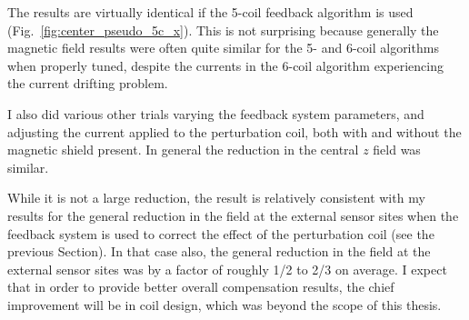 
The results are virtually identical if the 5-coil feedback algorithm
is used (Fig.~\ref{fig:center_pseudo_5c_x}).  This is not surprising
because generally the magnetic field results were often quite similar
for the 5- and 6-coil algorithms when properly tuned, despite the
currents in the 6-coil algorithm experiencing the current drifting
problem.




I also did various other trials varying the feedback system
parameters, and adjusting the current applied to the perturbation
coil, both with and without the magnetic shield present.  In general
the reduction in the central $z$ field was similar.

While it is not a large reduction, the result is relatively consistent
with my results for the general reduction in the field at the external
sensor sites when the feedback system is used to correct the effect of
the perturbation coil (see the previous Section).  In that case also,
the general reduction in the field at the external sensor sites was by a factor of roughly 1/2 to 2/3 on average.  I expect that in
order to provide better overall compensation results, the chief
improvement will be in coil design, which was beyond the scope of this
thesis.




